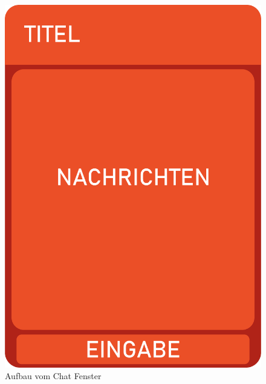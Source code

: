 \begin{figure}[hbt!]
    \centering
    \includegraphics[scale=0.4]{pics/chatWidgetStructure}
    \caption{Aufbau vom Chat Fenster}
    \label{fig:impl:chatWidget}
\end{figure}

